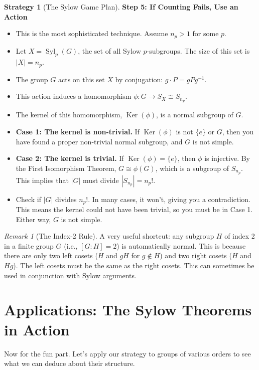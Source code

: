 \documentclass[12pt,a4paper]{article}
\theoremstyle{plain} %
\theoremstyle{definition} %
\newtheorem{strategy}[theorem]{Strategy}
\theoremstyle{remark} %
\newtheorem*{remark}{Remark}
\DeclareMathOperator{\Syl}{Syl}
\DeclareMathOperator{\Ker}{Ker}
\begin{document}
\begin{strategy}[The Sylow Game Plan]
\textbf{Step 5: If Counting Fails, Use an Action}
\begin{itemize}
    \item This is the most sophisticated technique. Assume $n_p > 1$ for some $p$.
    \item Let $X = \Syl_p(G)$, the set of all Sylow $p$-subgroups. The size of this set is $|X|=n_p$.
    \item The group $G$ acts on this set $X$ by conjugation: $g \cdot P = gPg^{-1}$.
    \item This action induces a homomorphism $\phi: G \to S_X \cong S_{n_p}$.
    \item The kernel of this homomorphism, $\Ker(\phi)$, is a normal subgroup of $G$.
    \item \textbf{Case 1: The kernel is non-trivial.} If $\Ker(\phi)$ is not $\{e\}$ or $G$, then you have found a proper non-trivial normal subgroup, and $G$ is not simple.
    \item \textbf{Case 2: The kernel is trivial.} If $\Ker(\phi)=\{e\}$, then $\phi$ is injective. By the First Isomorphism Theorem, $G \cong \phi(G)$, which is a subgroup of $S_{n_p}$. This implies that $|G|$ must divide $|S_{n_p}| = n_p!$.
    \item Check if $|G|$ divides $n_p!$. In many cases, it won't, giving you a contradiction. This means the kernel could not have been trivial, so you must be in Case 1. Either way, $G$ is not simple.
\end{itemize}
\end{strategy}

\begin{remark}[The Index-2 Rule]
A very useful shortcut: any subgroup $H$ of index 2 in a finite group $G$ (i.e., $[G:H]=2$) is automatically normal. This is because there are only two left cosets ($H$ and $gH$ for $g \notin H$) and two right cosets ($H$ and $Hg$). The left cosets must be the same as the right cosets. This can sometimes be used in conjunction with Sylow arguments.
\end{remark}

\newpage
\section{Applications: The Sylow Theorems in Action}

Now for the fun part. Let's apply our strategy to groups of various orders to see what we can deduce about their structure.
\end{document}
